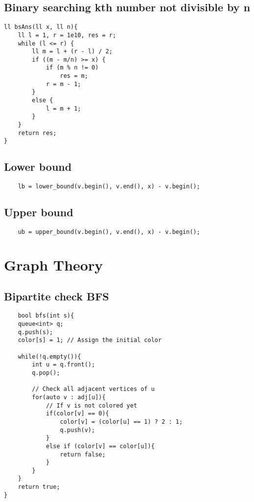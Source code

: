 \documentclass{article}
\begin{document}


\subsection{Binary searching kth number not divisible by n}
\begin{lstlisting}
ll bsAns(ll x, ll n){
    ll l = 1, r = 1e10, res = r;
    while (l <= r) {
        ll m = l + (r - l) / 2;
        if ((m - m/n) >= x) {
            if (m % n != 0)
                res = m;
            r = m - 1;  
        }
        else {
            l = m + 1;
        }
    }
    return res;
}
\end{lstlisting}

\subsection{Lower bound}
\begin{lstlisting}
    lb = lower_bound(v.begin(), v.end(), x) - v.begin();
\end{lstlisting}

\subsection{Upper bound}
\begin{lstlisting}
    ub = upper_bound(v.begin(), v.end(), x) - v.begin();
\end{lstlisting}

\section{Graph Theory}
\subsection{Bipartite check BFS}
\begin{lstlisting}
    bool bfs(int s){
    queue<int> q;
    q.push(s);
    color[s] = 1; // Assign the initial color
 
    while(!q.empty()){
        int u = q.front();
        q.pop();
 
        // Check all adjacent vertices of u
        for(auto v : adj[u]){
            // If v is not colored yet
            if(color[v] == 0){
                color[v] = (color[u] == 1) ? 2 : 1;
                q.push(v);
            }
            else if (color[v] == color[u]){
                return false;
            }
        }
    }
    return true;
}

\end{lstlisting}
\end{document}
